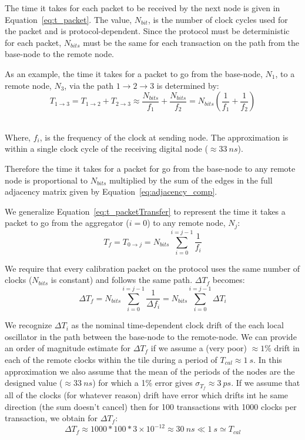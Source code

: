 The time it takes for each packet to be received by the next node is given in Equation~\ref{eq:t_packet}.
The value, $N_{bit}$, is the number of clock cycles used for the packet and is protocol-dependent.
Since the protocol must be deterministic for each packet, $N_{bits}$ must be the same for each transaction on the path from the base-node to the remote node.

As an example, the time it takes for a packet to go from the base-node, $N_{1}$, to a remote node, $N_{3}$, via the path $1\rightarrow 2 \rightarrow 3$ is determined by:
\begin{equation}
  T_{1\rightarrow 3} = T_{1\rightarrow 2} + T_{2\rightarrow 3} \approx \frac{N_{bits}}{f_{1}} + \frac{N_{bits}}{f_{2}} = N_{bits}(\frac{1}{f_{1}} + \frac{1}{f_{2}})
\end{equation}~\label{eq:t_packetTransfer}

Where, $f_{i}$, is the frequency of the clock at sending node. The approximation is within a single clock cycle of the receiving digital node ($\approx 33~\unit{ns}$).

Therefore the time it takes for a packet for go from the base-node to any remote node is proportional to $N_{bits}$ multiplied by the sum of the edges in the full adjacency matrix given by Equation~\ref{eq:adjacency_comp}.

We generalize Equation~\ref{eq:t_packetTransfer} to represent the time it takes a packet to go from the aggregator ($i = 0$) to any remote node, $N_{j}$:
\begin{equation}
  T_{f} = T_{0\rightarrow j} = N_{bits}\sum_{i=0}^{i=j-1}\frac{1}{f_{i}}
\end{equation}

We require that every calibration packet on the protocol uses the same number of clocks ($N_{bits}$ is constant) and follows the same path. $\Delta T_{f}$ becomes:
\begin{equation}
  \Delta T_{f} = N_{bits}\sum_{i=0}^{i=j-1}\frac{1}{\Delta f_{i}} = N_{bits} \sum_{i=0}^{i=j-1}\Delta T_{i}
\end{equation}

We recognize $\Delta T_{i}$ as the nominal time-dependent clock drift of the each local oscillator in the path between the base-node to the remote-node.
We can provide an order of magnitude estimate for $\Delta T_{f}$ if we assume a (very poor) $\approx 1\%$ drift in each of the remote clocks within the tile during a period of $T_{cal} \approx 1~\unit{s}$.
In this approximation we also assume that the mean of the periods of the nodes are the designed value ($\approx 33~\unit{ns}$) for which a 1\% error gives $\sigma_{T_{f}} \approx 3~\unit{ps}$.
If we assume that all of the clocks (for whatever reason) drift have error which drifts int he same direction (the sum doesn't cancel) then for 100 transactions with 1000 clocks per transaction, we obtain for $\Delta T_{f}$:
\begin{equation}
  \Delta T_{f} \approx 1000 * 100 * 3\times 10^{-12} \approx 30~\unit{ns} \ll 1~\unit{s} \simeq T_{cal}
\end{equation}

